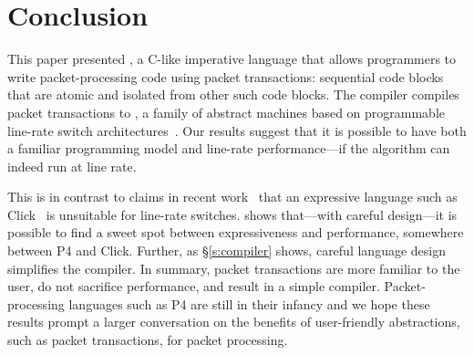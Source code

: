 \section{Conclusion}
\label{s:conclusion}

This paper presented \pktlanguage, a C-like imperative language that allows
programmers to write packet-processing code using packet transactions:
sequential code blocks that are atomic and isolated from other such code
blocks. The \pktlanguage compiler compiles packet transactions to \absmachine,
a family of abstract machines based on programmable line-rate switch
architectures~\cite{flexpipe, xpliant, rmt}. Our results suggest that it is
possible to have both a familiar programming model and line-rate
performance---if the algorithm can indeed run at line rate.

This is in contrast to claims in recent work~\cite{p4} that an expressive
language such as Click~\cite{click} is unsuitable for line-rate switches.
\pktlanguage shows that---with careful design---it is possible to find a sweet
spot between expressiveness and performance, somewhere between P4 and Click.
Further, as \S\ref{s:compiler} shows, careful language design simplifies the
compiler.  In summary, packet transactions are more familiar to the user, do
not sacrifice performance, and result in a simple compiler.  Packet-processing
languages such as P4 are still in their infancy and we hope these results
prompt a larger conversation on the benefits of user-friendly abstractions,
such as packet transactions, for packet processing.
